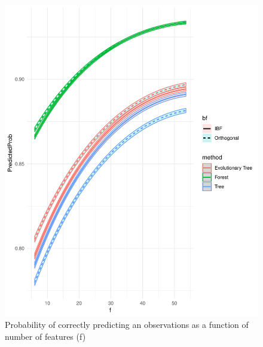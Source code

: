 \documentclass[]{elsarticle} %
\makeatletter
\def\maxwidth{\ifdim\Gin@nat@width>\linewidth\linewidth
\else\Gin@nat@width\fi}
\let\Oldincludegraphics\includegraphics
\renewcommand{\includegraphics}[1]{\Oldincludegraphics[width=\maxwidth]{#1}}
\makeatother
\begin{document}
\begin{figure}[htbp]
\centering
\includegraphics{Trees_with_Base_Functions_v2_files/figure-latex/fig13-estimated-accuracy-f-1.pdf}
\caption{\label{fig:fig13-estimated-accuracy-f}Probability of correctly
predicting an observations as a function of number of features (f)}
\end{figure}
\end{document}
